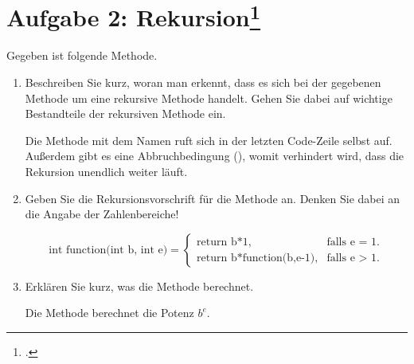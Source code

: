\documentclass{lehramt-informatik}
\begin{document}
%

\section{Aufgabe 2: Rekursion\footcite[Seite 2]{aud:ab:1}}

Gegeben ist folgende Methode.

\begin{enumerate}


\item Beschreiben Sie kurz, woran man erkennt, dass es sich bei der
gegebenen Methode um eine rekursive Methode handelt. Gehen Sie dabei auf
wichtige Bestandteile der rekursiven Methode ein.

\begin{antwort}
Die Methode mit dem Namen  ruft sich in der letzten
Code-Zeile selbst auf. Außerdem gibt es eine Abbruchbedingung
(), womit verhindert wird, dass die
Rekursion unendlich weiter läuft.
\end{antwort}


\item Geben Sie die Rekursionsvorschrift für die Methode 
an. Denken Sie dabei an die Angabe der Zahlenbereiche!

\begin{antwort}
\begin{equation*}
\text{int function(int b, int e)} =
\begin{cases}
\text{return b*1}, & \text{falls e = 1}.\\
\text{return b*function(b,e-1)}, & \text{falls e > 1}.
\end{cases}
\end{equation*}
\end{antwort}


\item Erklären Sie kurz, was die Methode  berechnet.

\begin{antwort}
Die Methode  berechnet die Potenz $b^e$.
\end{antwort}


\end{enumerate}
\end{document}
